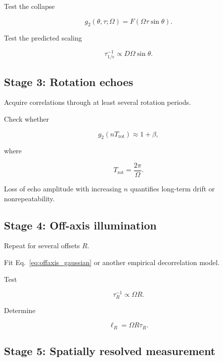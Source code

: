 \documentclass[11pt]{article}
\begin{document}
Test the collapse

\begin{equation}
    g_2(\theta,\tau;\Omega)
    =
    F\left(
        \Omega\tau\sin\theta
    \right).
\end{equation}

Test the predicted scaling

\begin{equation}
    \tau_{1/e}^{-1}
    \propto
    D\Omega\sin\theta.
\end{equation}

\subsection{Stage 3: Rotation echoes}

Acquire correlations through at least several rotation periods.

Check whether

\begin{equation}
    g_2(nT_{\mathrm{rot}})
    \approx
    1+\beta,
\end{equation}

where

\begin{equation}
    T_{\mathrm{rot}}=\frac{2\pi}{\Omega}.
\end{equation}

Loss of echo amplitude with increasing $n$ quantifies long-term drift or
nonrepeatability.

\subsection{Stage 4: Off-axis illumination}

Repeat for several offsets $R$.

Fit Eq.~\eqref{eq:offaxis_gaussian} or another empirical decorrelation model.

Test

\begin{equation}
    \tau_R^{-1}\propto\Omega R.
\end{equation}

Determine

\begin{equation}
    \ell_R=\Omega R\tau_R.
\end{equation}

\subsection{Stage 5: Spatially resolved measurement}
\end{document}
